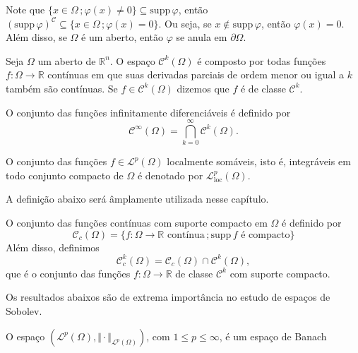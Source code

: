 \documentclass[a4paper, 11pt]{book}
\theoremstyle{definition}
\newcommand{\bR}{\mathbb{R}}
\newcommand{\cC}{\mathcal{C}}
\newcommand{\cL}{\mathcal{L}}
\newcommand{\supp}{\mathrm{supp}\,}
\begin{document}
Note que $\{x \in \Omega \,; \varphi(x) \neq 0\} \subseteq \supp \varphi$, então $(\supp \varphi)^\cC \subseteq \{x \in \Omega \,; \varphi(x) = 0\}$. Ou seja, se $x \not\in \supp \varphi$, então $\varphi(x) = 0$.
Além disso, se $\Omega$ é um aberto, então $\varphi$ se anula em $\partial\Omega$.

\begin{dbox}
    Seja $\Omega$ um aberto de $\bR^n$. O espaço $\cC^k(\Omega)$ é composto por todas funções $f : \Omega \to \bR$ contínuas em que suas derivadas parciais de ordem menor ou igual a $k$ também são contínuas.
    Se $f \in \cC^k(\Omega)$ dizemos que $f$ é de classe $\cC^k$.

    O conjunto das funções infinitamente diferenciáveis é definido por
    \[
        \cC^\infty(\Omega) = \bigcap_{k=0}^\infty \cC^k(\Omega).
    \]
\end{dbox}

\begin{dbox}
    O conjunto das funções $f \in \cL^p(\Omega)$ localmente somáveis, isto é, integráveis em todo conjunto compacto de $\Omega$ é denotado por $\cL^p_{\mathrm{loc}}(\Omega)$.
\end{dbox}

A definição abaixo será âmplamente utilizada nesse capítulo.

\begin{dbox}
    O conjunto das funções contínuas com suporte compacto em $\Omega$ é definido por
    \[
        \cC_c(\Omega) = \{f : \Omega \to \bR \text{ contínua} \,; \supp f \text{ é compacto}\}
    \]
    Além disso, definimos
    \[
        \cC^k_c(\Omega) = \cC_c(\Omega) \cap \cC^k(\Omega),
    \]
    que é o conjunto das funções $f : \Omega \to \bR$ de classe $\cC^k$ com suporte compacto.
\end{dbox}

\begin{dbox}[Espaços $\cL^p$ e $\cL^\infty$]
    
\end{dbox}

Os resultados abaixos são de extrema importância no estudo de espaços de Sobolev.

\begin{tbox} \label{thm:lp-completo-pre}
    O espaço $(\cL^p(\Omega), \Vert \cdot \Vert_{\cL^p(\Omega)})$, com $1 \leqslant p \leqslant \infty$, é um espaço de Banach\footnotemark
\end{tbox}
\begin{prf}
    
\end{prf}
\end{document}
